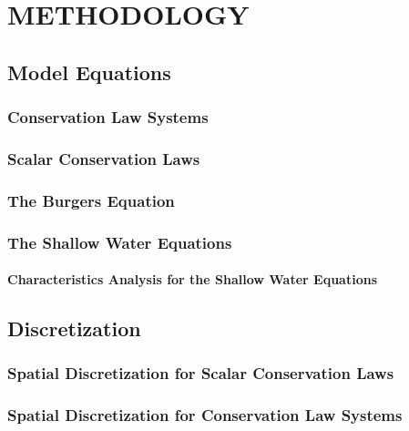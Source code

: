 \chapter{METHODOLOGY}

\section{Model Equations}
\subsection{Conservation Law Systems}
  
\subsection{Scalar Conservation Laws}
  
\subsection{The Burgers Equation}
%  
\subsection{The Shallow Water Equations\label{sec:shallowwater}}
  
  \subsubsection{Characteristics Analysis for the Shallow Water Equations}
    
\section{Discretization}
\subsection{Spatial Discretization for Scalar Conservation Laws
  \label{sec:spatial_discretization_scalar}}
  
\subsection{Spatial Discretization for Conservation Law Systems
  \label{sec:spatial_discretization_system}}
  
